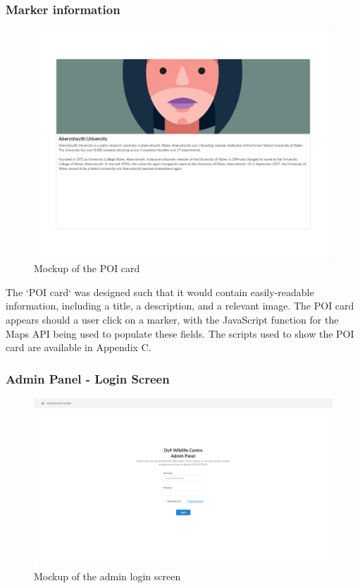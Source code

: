 \subsubsection{Marker information}
\begin{figure}[H]
\includegraphics[scale=0.2]{mockups/POI card}
\caption{Mockup of the POI card}
\end{figure}

The `POI card` was designed such that it would contain easily-readable information, including a title, a description, and a relevant image. The POI card appears should a user click on a marker, with the JavaScript function for the Maps API being used to populate these fields. The scripts used to show the POI card are available in Appendix C.

\subsubsection{Admin Panel - Login Screen}
\begin{figure}[H]
\includegraphics[scale=0.2]{mockups/Admin login screen}
\caption{Mockup of the admin login screen}
\end{figure}

